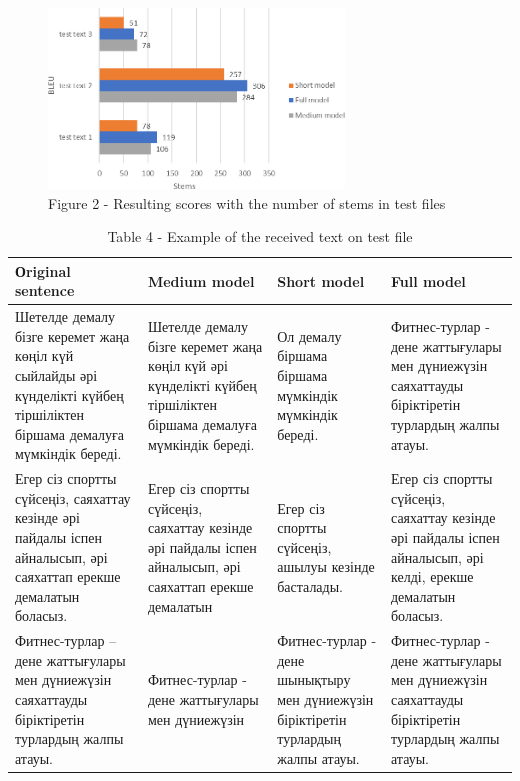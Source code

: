 \begin{figure}[H]
	\centering
	\includegraphics[width=0.7\textwidth]{assets/56}
	\caption*{Figure 2 - Resulting scores with the number of stems in test files}
\end{figure}

\begin{table}[H]
\caption*{Table 4 - Example of the received text on test file}
\centering
\begin{tabular}{|p{}|p{}|p{}|p{}|}
\hline
Оriginal sentence & Medium model & Short model & Full model \\ \hline
Шетелде демалу бізге керемет жаңа көңіл күй сыйлайды әрі күнделікті күйбең тіршіліктен біршама демалуға мүмкіндік береді. & Шетелде демалу бізге керемет жаңа көңіл күй әрі күнделікті күйбең тіршіліктен біршама демалуға мүмкіндік береді. & Ол демалу біршама біршама мүмкіндік мүмкіндік береді. & Фитнес-турлар - дене жаттығулары мен дүниежүзін саяхаттауды біріктіретін турлардың жалпы атауы. \\ \hline
Егер сіз спортты сүйсеңіз, саяхаттау кезінде әрі пайдалы іспен айналысып, әрі саяхаттап ерекше демалатын боласыз. & Егер сіз спортты сүйсеңіз, саяхаттау кезінде әрі пайдалы іспен айналысып, әрі саяхаттап ерекше демалатын & Егер сіз спортты сүйсеңіз, ашылуы кезінде басталады. & Егер сіз спортты сүйсеңіз, саяхаттау кезінде әрі пайдалы іспен айналысып, әрі келді, ерекше демалатын боласыз. \\ \hline
Фитнес-турлар – дене жаттығулары мен дүниежүзін саяхаттауды біріктіретін турлардың жалпы атауы. & Фитнес-турлар - дене жаттығулары мен дүниежүзін & Фитнес-турлар - дене шынықтыру мен дүниежүзін біріктіретін турлардың жалпы атауы. & Фитнес-турлар - дене жаттығулары мен дүниежүзін саяхаттауды біріктіретін турлардың жалпы атауы. \\ \hline
\end{tabular}
\end{table}

